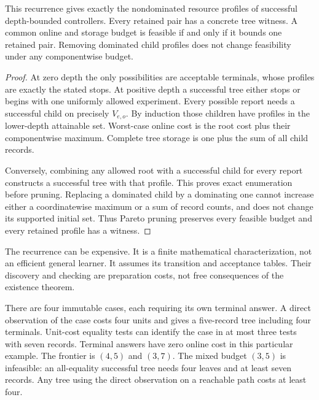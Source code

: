 \begin{theorem}\label{r:inquiry}
This recurrence gives exactly the nondominated resource profiles of successful depth-bounded controllers. Every retained pair has a concrete tree witness. A common online and storage budget is feasible if and only if it bounds one retained pair. Removing dominated child profiles does not change feasibility under any componentwise budget.
\end{theorem}
\begin{proof}
At zero depth the only possibilities are acceptable terminals, whose profiles are exactly the stated stops. At positive depth a successful tree either stops or begins with one uniformly allowed experiment. Every possible report needs a successful child on precisely $V_{e,o}$. By induction those children have profiles in the lower-depth attainable set. Worst-case online cost is the root cost plus their componentwise maximum. Complete tree storage is one plus the sum of all child records.

Conversely, combining any allowed root with a successful child for every report constructs a successful tree with that profile. This proves exact enumeration before pruning. Replacing a dominated child by a dominating one cannot increase either a coordinatewise maximum or a sum of record counts, and does not change its supported initial set. Thus Pareto pruning preserves every feasible budget and every retained profile has a witness.
\end{proof}

The recurrence can be expensive. It is a finite mathematical characterization, not an efficient general learner. It assumes its transition and acceptance tables. Their discovery and checking are preparation costs, not free consequences of the existence theorem.

\begin{counterexample}\label{ce:pareto}
There are four immutable cases, each requiring its own terminal answer. A direct observation of the case costs four units and gives a five-record tree including four terminals. Unit-cost equality tests can identify the case in at most three tests with seven records. Terminal answers have zero online cost in this particular example. The frontier is $(4,5)$ and $(3,7)$. The mixed budget $(3,5)$ is infeasible: an all-equality successful tree needs four leaves and at least seven records. Any tree using the direct observation on a reachable path costs at least four.
\end{counterexample}

